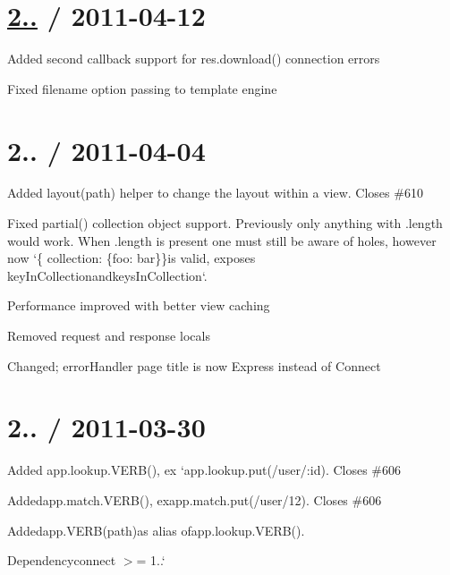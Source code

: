 \section*{\hyperlink{namespace2_1_12_1_12}{2..} / 2011-\/04-\/12 }


\begin{DoxyItemize}
\item Added second callback support for {\ttfamily res.\+download()} connection errors
\item Fixed {\ttfamily filename} option passing to template engine
\end{DoxyItemize}

\section*{2.. / 2011-\/04-\/04 }


\begin{DoxyItemize}
\item Added {\ttfamily layout(path)} helper to change the layout within a view. Closes \#610
\item Fixed {\ttfamily partial()} collection object support. Previously only anything with {\ttfamily .length} would work. When {\ttfamily .length} is present one must still be aware of holes, however now `\{ collection\+: \{foo\+: \textquotesingle{}bar\textquotesingle{}\}\}{\ttfamily is valid, exposes }key\+In\+Collection{\ttfamily and}keys\+In\+Collection`.
\item Performance improved with better view caching
\item Removed {\ttfamily request} and {\ttfamily response} locals
\item Changed; error\+Handler page title is now {\ttfamily Express} instead of {\ttfamily Connect}
\end{DoxyItemize}

\section*{2.. / 2011-\/03-\/30 }


\begin{DoxyItemize}
\item Added {\ttfamily app.\+lookup.\+V\+E\+R\+B()}, ex `app.lookup.\+put(\textquotesingle{}/user/\+:id\textquotesingle{}){\ttfamily . Closes \#606}
\item {\ttfamily Added}app.\+match.\+V\+E\+R\+B(){\ttfamily , ex}app.\+match.\+put(\textquotesingle{}/user/12\textquotesingle{}){\ttfamily . Closes \#606}
\item {\ttfamily Added}app.\+V\+E\+R\+B(path){\ttfamily as alias of}app.\+lookup.\+V\+E\+R\+B(){\ttfamily .}
\item {\ttfamily Dependency}connect $>$= 1..`
\end{DoxyItemize}

